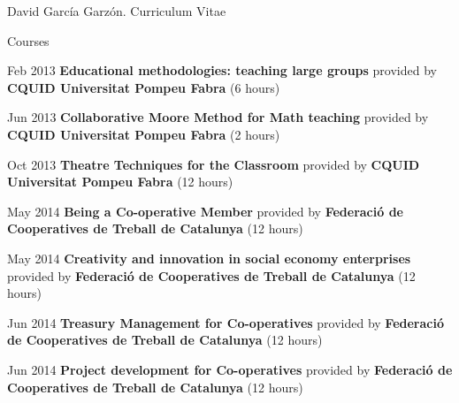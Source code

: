 \documentclass{article}
\begin{document}
\begin{cv}{David García Garzón. Curriculum Vitae}
\begin{cvlist}{Courses}
\item[Feb 2013]
	{\bf Educational methodologies: teaching large groups } provided by {\bf CQUID Universitat Pompeu Fabra} (6 hours)

\item[Jun 2013]
	{\bf Collaborative Moore Method for Math teaching } provided by {\bf CQUID Universitat Pompeu Fabra} (2 hours)

\item[Oct 2013]
	{\bf Theatre Techniques for the Classroom } provided by {\bf CQUID Universitat Pompeu Fabra} (12 hours)

\item[May 2014]
	{\bf Being a Co-operative Member } provided by {\bf Federació de Cooperatives de Treball de Catalunya} (12 hours)

\item[May 2014]
	{\bf Creativity and innovation in social economy enterprises } provided by {\bf Federació de Cooperatives de Treball de Catalunya} (12 hours)

\item[Jun 2014]
	{\bf Treasury Management for Co-operatives } provided by {\bf Federació de Cooperatives de Treball de Catalunya} (12 hours)

\item[Jun 2014]
	{\bf Project development for Co-operatives } provided by {\bf Federació de Cooperatives de Treball de Catalunya} (12 hours)

\end{cvlist}


\end{cv}
\end{document}

